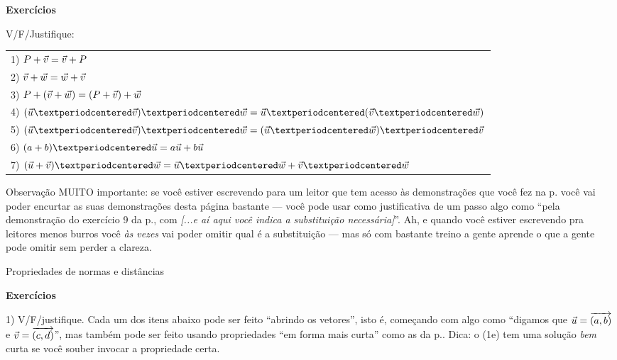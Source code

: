 \documentclass[oneside]{book}
\begin{document}
\msk

{\bf Exercícios}

V/F/Justifique:

\begin{tabular}[t]{l}
1) $P+{\vec v} = {\vec v}+P$       \\
2) ${\vec v}+{\vec w} = {\vec w}+{\vec v}$   \\
3) $P+({\vec v}+{\vec w}) = (P+{\vec v})+{\vec w}$ \\
4) $(\uu·\vv)·\ww = \uu·(\vv·\ww)$ \\
5) $(\uu·\vv)·\ww = (\uu·\ww)·\vv$ \\
6) $(a+b)·\uu = a\uu + b\uu$ \\
7) $(\uu+\vv)·\ww = \uu·\ww + \vv·\ww$ \\
\end{tabular}

\msk

Observação MUITO importante: se você estiver escrevendo para um leitor
que tem acesso às demonstrações que você fez na
p.\pageref{propriedades-basicas} você vai poder encurtar as suas
demonstrações desta página bastante --- você pode usar como
justificativa de um passo algo como ``pela demonstração do exercício 9
da p.\pageref{propriedades-basicas}, com {\sl [...e aí aqui você
    indica a substituição necessária]}''. Ah, e quando você estiver
escrevendo pra leitores menos burros você {\sl às vezes} vai poder
omitir qual é a substituição --- mas só com bastante treino a gente
aprende o que a gente pode omitir sem perder a clareza.











\newpage

%
 {Propriedades de normas e distâncias}

{\bf Exercícios}

1) V/F/justifique. Cada um dos itens abaixo pode ser feito ``abrindo
os vetores'', isto é, começando com algo como ``digamos que ${\vec u}={\overrightarrow{(a,b)}}$
e ${\vec v}={\overrightarrow{(c,d)}}$'', mas também pode ser feito usando propriedades ``em
forma mais curta'' como as da p.\pageref{propriedades-basicas-2}.
Dica: o (1e) tem uma solução {\sl bem} curta se você souber invocar a
propriedade certa.
\end{document}
